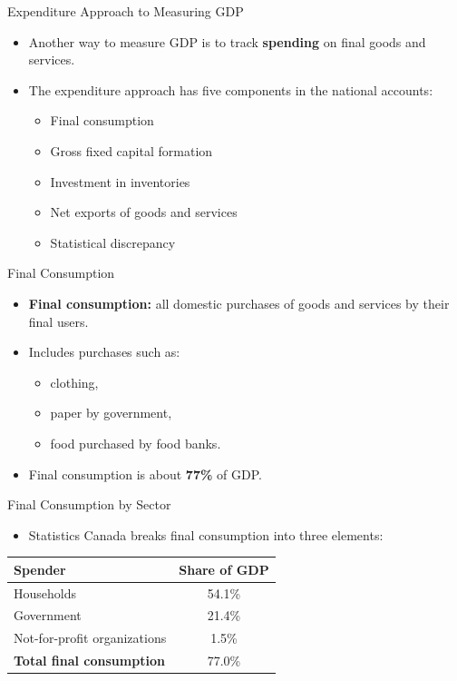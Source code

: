 \documentclass[aspectratio=169]{beamer}
\begin{document}
\begin{frame}{Expenditure Approach to Measuring GDP}
\transfade
\begin{itemize}[<+->]
  \item Another way to measure GDP is to track \textbf{spending} on final goods and services.
  \item The expenditure approach has \alert{five components} in the national accounts:
  \begin{itemize}[<+->]
    \item Final consumption
    \item Gross fixed capital formation
    \item Investment in inventories
    \item Net exports of goods and services
    \item Statistical discrepancy
  \end{itemize}
\end{itemize}
\end{frame}

\begin{frame}{Final Consumption}
\transfade
\begin{itemize}[<+->]
  \item \textbf{Final consumption:} all domestic purchases of goods and services by their final users.
  \item Includes purchases such as:
  \begin{itemize}[<+->]
    \item clothing,
    \item paper by government,
    \item food purchased by food banks.
  \end{itemize}
  \item Final consumption is about \textbf{77\%} of GDP.
\end{itemize}
\end{frame}

\begin{frame}{Final Consumption by Sector}
\transfade
\small
\begin{itemize}[<+->]
  \item Statistics Canada breaks final consumption into three elements:
\end{itemize}
\begin{tabular}{l c}
\toprule
\textbf{Spender} & \textbf{Share of GDP} \\
\midrule
Households & 54.1\% \\
Government & 21.4\% \\
Not-for-profit organizations & 1.5\% \\
\midrule
\textbf{Total final consumption} & 77.0\% \\
\bottomrule
\end{tabular}
\end{frame}
\end{document}
